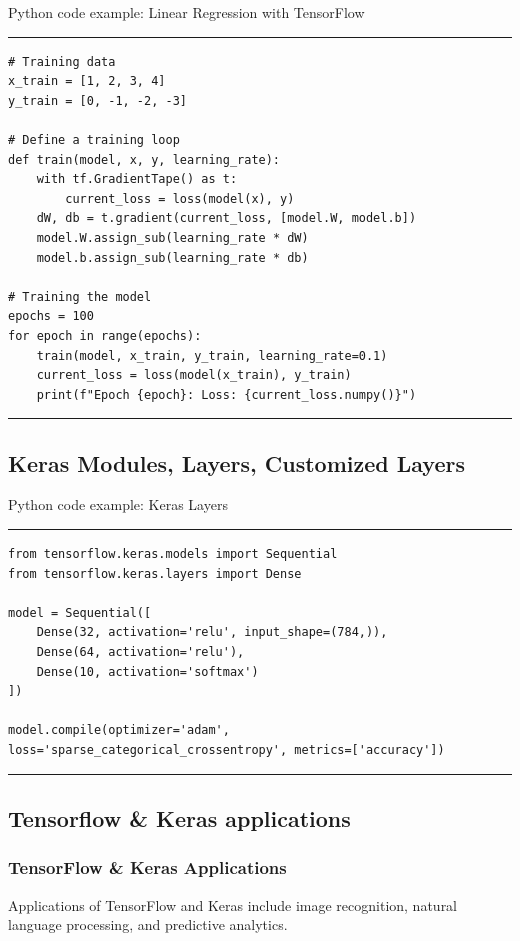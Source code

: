 \documentclass[aspectratio=169, hideothersubsections]{beamer}
\begin{document}
\begin{frame}[fragile]{Python code example: Linear Regression with TensorFlow}
\rule{\textwidth}{1pt}
\scriptsize
\begin{verbatim}
# Training data
x_train = [1, 2, 3, 4]
y_train = [0, -1, -2, -3]

# Define a training loop
def train(model, x, y, learning_rate):
    with tf.GradientTape() as t:
        current_loss = loss(model(x), y)
    dW, db = t.gradient(current_loss, [model.W, model.b])
    model.W.assign_sub(learning_rate * dW)
    model.b.assign_sub(learning_rate * db)

# Training the model
epochs = 100
for epoch in range(epochs):
    train(model, x_train, y_train, learning_rate=0.1)
    current_loss = loss(model(x_train), y_train)
    print(f"Epoch {epoch}: Loss: {current_loss.numpy()}")
\end{verbatim}
\rule{\textwidth}{1pt}
\end{frame}

\subsection{Keras Modules, Layers, Customized Layers}
\begin{frame}[fragile]{Python code example: Keras Layers}
\rule{\textwidth}{1pt}
\scriptsize
\begin{verbatim}
from tensorflow.keras.models import Sequential
from tensorflow.keras.layers import Dense

model = Sequential([
    Dense(32, activation='relu', input_shape=(784,)),
    Dense(64, activation='relu'),
    Dense(10, activation='softmax')
])

model.compile(optimizer='adam', loss='sparse_categorical_crossentropy', metrics=['accuracy'])
\end{verbatim}
\rule{\textwidth}{1pt}
\end{frame}

\subsection{Tensorflow \& Keras applications}
\begin{frame}
\frametitle{TensorFlow \& Keras Applications}
Applications of TensorFlow and Keras include image recognition, natural language processing, and predictive analytics.
\end{frame}
\end{document}
